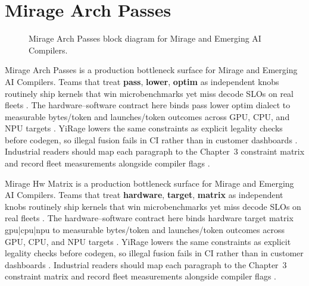\section{Mirage Arch Passes}
\label{sec:mirage_arch_passes}
\begin{figure}[t]
\centering
{}
\caption{Mirage Arch Passes block diagram for Mirage and Emerging AI Compilers.}
\label{fig:mirage_arch_passes_architecture}
\end{figure}


Mirage Arch Passes is a production bottleneck surface for Mirage and Emerging AI Compilers. Teams that treat \textbf{pass}, \textbf{lower}, \textbf{optim} as independent knobs routinely ship kernels that win microbenchmarks yet miss decode SLOs on real fleets \citep{taxbreak2026,semianalysis2024tma}. The hardware--software contract here binds pass lower optim dialect to measurable bytes/token and launches/token outcomes across GPU, CPU, and NPU targets \citep{memoryfloor2026,amd2024xdna}. YiRage lowers the same constraints as explicit legality checks before codegen, so illegal fusion fails in CI rather than in customer dashboards \citep{nvidia2022hopper,amd2024aie}. Industrial readers should map each paragraph to the Chapter~3 constraint matrix and record fleet measurements alongside compiler flags \citep{semianalysis2024tma,dlbook}.

Mirage Hw Matrix is a production bottleneck surface for Mirage and Emerging AI Compilers. Teams that treat \textbf{hardware}, \textbf{target}, \textbf{matrix} as independent knobs routinely ship kernels that win microbenchmarks yet miss decode SLOs on real fleets \citep{liu2024deepseekv3,memoryfloor2026}. The hardware--software contract here binds hardware target matrix gpu|cpu|npu to measurable bytes/token and launches/token outcomes across GPU, CPU, and NPU targets \citep{patel2025llminference,nvidia2022hopper}. YiRage lowers the same constraints as explicit legality checks before codegen, so illegal fusion fails in CI rather than in customer dashboards \citep{taxbreak2026,semianalysis2024tma}. Industrial readers should map each paragraph to the Chapter~3 constraint matrix and record fleet measurements alongside compiler flags \citep{memoryfloor2026,amd2024xdna}.

